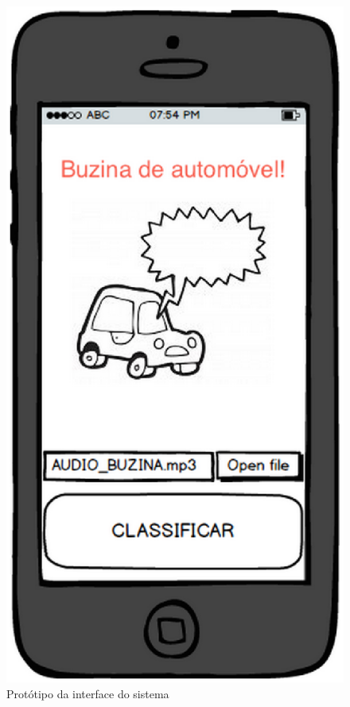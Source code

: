 \begin{figure}[H]
	\centering
	\captionsetup{justification=centering,margin=2cm}
	\includegraphics[scale=0.65]{capitulos/validacao/figuras/interfaceDaAplicacao.eps}
	\caption{Protótipo da interface do sistema}
	\label{fig:result-engajamento}
\end{figure}

